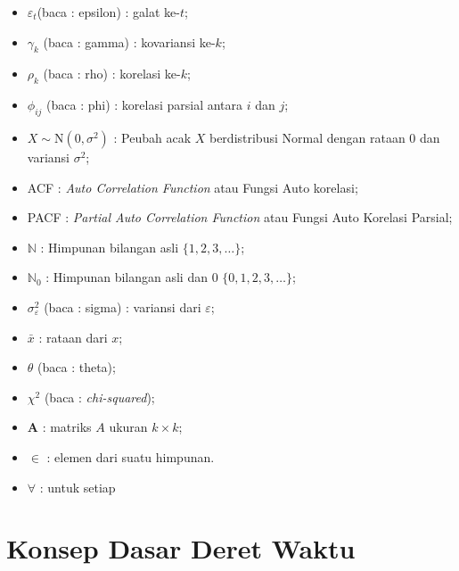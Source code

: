 \documentclass[
]{book}
\providecommand{\tightlist}{%
  \setlength{\itemsep}{0pt}\setlength{\parskip}{0pt}}
\begin{document}
\begin{itemize}
\tightlist
\item
  \(\varepsilon_t\)(baca : epsilon) : galat ke-\(t\);\\
\item
  \(\gamma_k\) (baca : gamma) : kovariansi ke-\(k\);\\
\item
  \(\rho_k\) (baca : rho) : korelasi ke-\(k\);\\
\item
  \(\phi_{ij}\) (baca : phi) : korelasi parsial antara \(i\) dan \(j\);\\
\item
  \(X \sim \text{N}(0,\sigma^2)\) : Peubah acak \(X\) berdistribusi Normal dengan rataan 0 dan variansi \(\sigma^2\);\\
\item
  ACF : \emph{Auto Correlation Function} atau Fungsi Auto korelasi;\\
\item
  PACF : \emph{Partial Auto Correlation Function} atau Fungsi Auto Korelasi Parsial;\\
\item
  \(\mathbb{N}\) : Himpunan bilangan asli \(\{1,2,3,\dots\}\);\\
\item
  \(\mathbb{N}_0\) : Himpunan bilangan asli dan 0 \(\{0,1,2,3,\dots\}\);\\
\item
  \(\sigma^2_\varepsilon\) (baca : sigma) : variansi dari \(\varepsilon\);\\
\item
  \(\bar{x}\) : rataan dari \(x\);\\
\item
  \(\theta\) (baca : theta);\\
\item
  \(\chi^2\) (baca : \emph{chi-squared});\\
\item
  \(\mathbf{A}\) : matriks \(A\) ukuran \(k\times k\);\\
\item
  \(\in\) : elemen dari suatu himpunan.\\
\item
  \(\forall\) : untuk setiap
\end{itemize}

\hypertarget{konsep-dasar-deret-waktu}{%
\chapter{Konsep Dasar Deret Waktu}\label{konsep-dasar-deret-waktu}}
\end{document}
